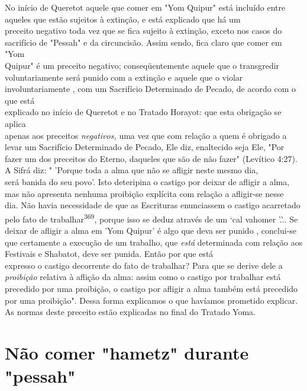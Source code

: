 \begin{itemize}
\begin{enumrate}
\begin{itemize}
\begin{itemize}
\begin{itemize}
No início de Queretot aquele que comer em "Yom Quipur" está incluído
entre aqueles que estão sujeitos à extinção, e está explicado que
há um\\
preceito negativo toda vez que se fica sujeito à extinção, exceto nos
casos do sacrifício
de "Pessah" e da circuncisão. Assim sendo, fica claro que comer
em "Yom\\
Quipur" é um preceito negativo; conseqüentemente aquele que o
transgredir\\
voluntariamente será punido com a extinção e aquele que o violar
involuntariamente
, com um Sacrifício Determinado de Pecado, de acordo com o que
está\\
explicado no início de Queretot e no Tratado Horayot: que esta obrigação
se aplica\\
apenas aos preceitos \emph{negativos,} uma vez que com relação a quem é
obrigado a\\
levar um Sacrifício Determinado de Pecado, Ele diz, enaltecido seja Ele,
"Por fazer
um dos preceitos do Eterno, daqueles que são de não fazer" (Levítico
4:27).\\
A Sifrá diz: " 'Porque toda a alma que não se afligir neste mesmo dia,\\
será banida do seu povo'. Isto deteripina o castigo por deixar de
afligir a alma,\\
mas não apresenta nenhuma proibição explícita com relação a afligir-se
nesse\\
dia. Não havia necessidade de que as Escrituras enunciassem o castigo
acarretado
pelo fato de trabalhar\textsuperscript{369}, porque isso se deduz
através de um `cal vahomer
'.'.. Se deixar de afligir a alma
em 'Yom Quipur' é algo que deva ser punido
, conclui-se que certamente a execução de um trabalho, que \emph{está}
determinada
com relação aos Festivais e Shabatot, deve ser punida. Então por que
está\\
expresso o castigo decorrente do fato de trabalhar? Para que se derive
dele a\\
\emph{proibição} relativa à aflição da alma: assim como o castigo por
trabalhar está precedido
por uma proibição, o castigo por afligir a alma também está
precedido\\
por uma proibição". Dessa forma explicamos o que havíamos prometido
explicar.\\
As normas deste preceito estão explicadas no final do Tratado Yoma.


\section{Não comer "hametz" durante "pessah"}


\end{itemize}
\end{itemize}
\end{itemize}
\end{enumrate}
\end{itemize}

